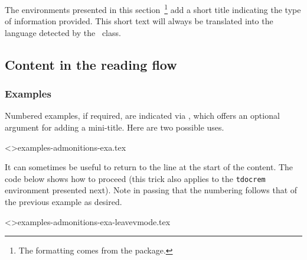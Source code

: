 \begin{tdocnote}
    The environments presented in this section\,%
    \footnote{
        The formatting comes from the  package.
    }
    add a short title indicating the type of information provided.
    This short text will always be translated into the language detected by the \thisproj\ class.
\end{tdocnote}


\subsection{Content in the reading flow}








\subsubsection{Examples}

Numbered examples, if required, are indicated via , which offers an optional argument for adding a mini-title.
Here are two possible uses.

\tdoclatexinput<>{examples-admonitions-exa.tex}




\begin{tdoctip}
    It can sometimes be useful to return to the line at the start of the content. The code below shows how to proceed (this trick also applies to the \verb#tdocrem# environment presented next). Note in passing that the numbering follows that of the previous example as desired.
\end{tdoctip}

\tdoclatexinput<>{examples-admonitions-exa-leavevmode.tex}



